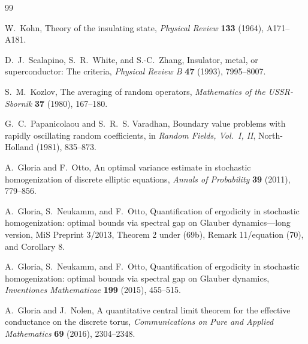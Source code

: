 \documentclass[11pt]{article}
\theoremstyle{definition}
\theoremstyle{remark}
\begin{document}
\begin{thebibliography}{99}

W.~Kohn,
\newblock Theory of the insulating state,
\newblock \emph{Physical Review} \textbf{133} (1964), A171--A181.

D.~J.~Scalapino, S.~R.~White, and S.-C.~Zhang,
\newblock Insulator, metal, or superconductor: The criteria,
\newblock \emph{Physical Review B} \textbf{47} (1993), 7995--8007.

S.~M.~Kozlov,
\newblock The averaging of random operators,
\newblock \emph{Mathematics of the USSR-Sbornik} \textbf{37} (1980), 167--180.

G.~C.~Papanicolaou and S.~R.~S. Varadhan,
\newblock Boundary value problems with rapidly oscillating random coefficients,
\newblock in \emph{Random Fields, Vol.~I, II}, North-Holland (1981), 835--873.

A.~Gloria and F.~Otto,
\newblock An optimal variance estimate in stochastic homogenization of discrete elliptic equations,
\newblock \emph{Annals of Probability} \textbf{39} (2011), 779--856.

A.~Gloria, S.~Neukamm, and F.~Otto,
\newblock Quantification of ergodicity in stochastic homogenization: optimal bounds via spectral gap on Glauber dynamics---long version,
\newblock MiS Preprint 3/2013, Theorem 2 under (69b), Remark 11/equation (70), and Corollary 8.

A.~Gloria, S.~Neukamm, and F.~Otto,
\newblock Quantification of ergodicity in stochastic homogenization: optimal bounds via spectral gap on Glauber dynamics,
\newblock \emph{Inventiones Mathematicae} \textbf{199} (2015), 455--515.

A.~Gloria and J.~Nolen,
\newblock A quantitative central limit theorem for the effective conductance on the discrete torus,
\newblock \emph{Communications on Pure and Applied Mathematics} \textbf{69} (2016), 2304--2348.

\end{thebibliography}
\end{document}
